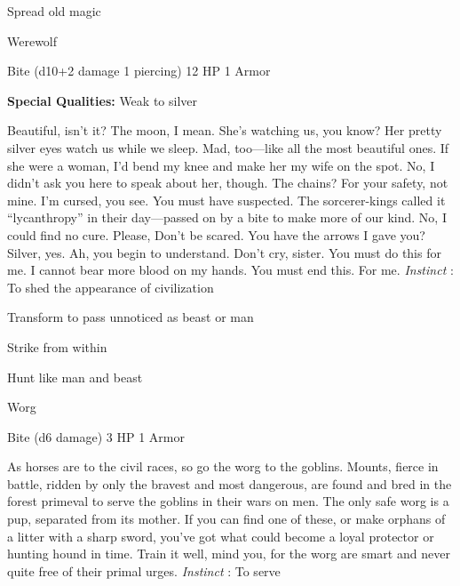          
\item Spread old magic

       
\stopitemize
       
\startMonsterName
Werewolf	 
\stopMonsterName
       

Bite (d10+2 damage 1 piercing)	12 HP	1 Armor

       


       
\startMonsterQualities
         {\bf Special Qualities:}  Weak to silver
\stopMonsterQualities
       
\startMonsterDescription
Beautiful, isn’t it? The moon, I mean. She’s watching us, you know? Her pretty silver eyes watch us while we sleep. Mad, too—like all the most beautiful ones. If she were a woman, I’d bend my knee and make her my wife on the spot. No, I didn’t ask you here to speak about her, though. The chains? For your safety, not mine. I’m cursed, you see. You must have suspected. The sorcerer-kings called it “lycanthropy” in their day—passed on by a bite to make more of our kind. No, I could find no cure. Please, Don’t be scared. You have the arrows I gave you? Silver, yes. Ah, you begin to understand. Don’t cry, sister. You must do this for me. I cannot bear more blood on my hands. You must end this. For me. {\em Instinct} : To shed the appearance of civilization
\stopMonsterDescription
       
\startitemize[1,packed]
         
\item Transform to pass unnoticed as beast or man

         
\item Strike from within

         
\item Hunt like man and beast

       
\stopitemize
       
\startMonsterName
Worg	 
\stopMonsterName
       

Bite (d6 damage)	3 HP	1 Armor

       


       
\startMonsterDescription
As horses are to the civil races, so go the worg to the goblins. Mounts, fierce in battle, ridden by only the bravest and most dangerous, are found and bred in the forest primeval to serve the goblins in their wars on men. The only safe worg is a pup, separated from its mother. If you can find one of these, or make orphans of a litter with a sharp sword, you’ve got what could become a loyal protector or hunting hound in time. Train it well, mind you, for the worg are smart and never quite free of their primal urges. {\em Instinct} : To serve
\stopMonsterDescription
       
